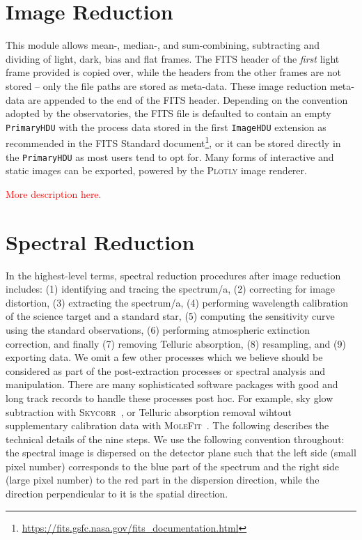 \documentclass[twocolumn, linenumbers]{aastex631}
\begin{document}
\section{Image Reduction}
This module allows mean-, median-, and sum-combining, subtracting and dividing
of light, dark, bias and flat frames. The FITS header of the \textit{first}
light frame provided is copied over, while the headers from the other frames
are not stored -- only the file paths are stored as meta-data. These image
reduction meta-data are appended to the end of the FITS header. Depending on
the convention adopted by the observatories, the FITS file is defaulted to
contain an empty \texttt{PrimaryHDU} with the process data stored in the
first \texttt{ImageHDU} extension as recommended in the FITS Standard 
document\footnote{\url{https://fits.gsfc.nasa.gov/fits_documentation.html}},
or it can be stored directly in the \texttt{PrimaryHDU} as most users tend
to opt for. Many forms of interactive and static images can be exported,
powered by the \textsc{Plotly} image renderer.

{\Huge\textcolor{red}{More description here.}}

\section{Spectral Reduction}
In the highest-level terms, spectral reduction procedures after image reduction
includes: (1) identifying and tracing the spectrum/a, (2) correcting for image
distortion, (3) extracting the spectrum/a, (4) performing wavelength
calibration of the science target and a standard star, (5) computing the
sensitivity curve using the standard observations, (6) performing atmospheric
extinction correction, and finally (7) removing Telluric absorption,
(8) resampling, and (9) exporting data. We omit a few other processes which we
believe should be considered as part of the post-extraction processes or
spectral analysis and manipulation. There are many sophisticated software
packages with good and long track records to handle these processes post hoc.
For example, sky glow subtraction with
\textsc{Skycorr}~\citep{2014A&A...567A..25N}, or Telluric
absorption removal wihtout supplementary calibration data with
\textsc{MoleFit}~\citep{2015A&A...576A..77S, 2015A&A...576A..78K}.
The following describes the technical details of the nine steps. We use the
following convention throughout: the spectral image is dispersed on the detector
plane such that the left side (small pixel number) corresponds to the blue part
of the spectrum and the right side (large pixel number) to the red part in the
dispersion direction, while the direction perpendicular to it is the spatial
direction.
\end{document}
